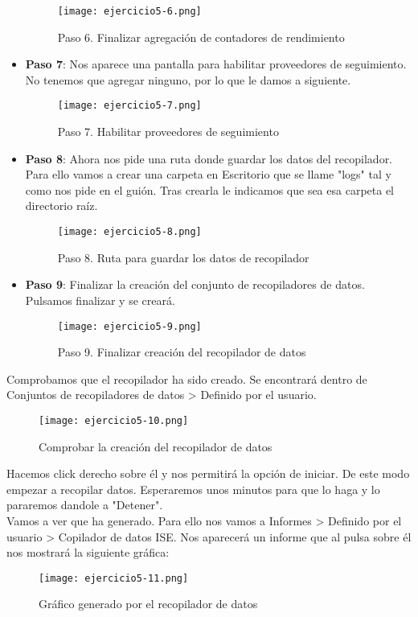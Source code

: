 \begin{itemize}
			\begin{figure}[H] 
				\centering
				\texttt{[image: ejercicio5-6.png]} 
				\label{figura2} 
				\caption{Paso 6. Finalizar agregación de contadores de rendimiento}
			\end{figure}
		\item \textbf{Paso 7}: Nos aparece una pantalla para habilitar proveedores de seguimiento. No tenemos que agregar ninguno, por lo que le damos a siguiente.
			\begin{figure}[H] 
				\centering
				\texttt{[image: ejercicio5-7.png]} 
				\label{figura2} 
				\caption{Paso 7. Habilitar proveedores de seguimiento}
			\end{figure}
		\item \textbf{Paso 8}: Ahora nos pide una ruta donde guardar los datos del recopilador. Para ello vamos a crear una carpeta en Escritorio que se llame "logs" tal y como nos pide en el guión. Tras crearla le indicamos que sea esa carpeta el directorio raíz.
			\begin{figure}[H] 
				\centering
				\texttt{[image: ejercicio5-8.png]} 
				\label{figura2} 
				\caption{Paso 8. Ruta para guardar los datos de recopilador}
			\end{figure}
		\item \textbf{Paso 9}: Finalizar la creación del conjunto de recopiladores de datos. Pulsamos finalizar y se creará.
			\begin{figure}[H] 
				\centering
				\texttt{[image: ejercicio5-9.png]} 
				\label{figura2} 
				\caption{Paso 9. Finalizar creación del recopilador de datos}
			\end{figure}
	\end{itemize}
	
	
	Comprobamos que el recopilador ha sido creado. Se encontrará dentro de Conjuntos de recopiladores de datos > Definido por el usuario.
	\begin{figure}[H] 
		\centering
		\texttt{[image: ejercicio5-10.png]} 
		\label{figura2} 
		\caption{Comprobar la creación del recopilador de datos}
	\end{figure}
	
	Hacemos click derecho sobre él y nos permitirá la opción de iniciar. De este modo empezar a recopilar datos. Esperaremos unos minutos para que lo haga y lo pararemos dandole a "Detener".\\
	
	Vamos a ver que ha generado. Para ello nos vamos a Informes > Definido por el usuario > Copilador de datos ISE. Nos aparecerá un informe que al pulsa sobre él nos mostrará la siguiente gráfica:
	\begin{figure}[H] 
		\centering
		\texttt{[image: ejercicio5-11.png]} 
		\label{figura2} 
		\caption{Gráfico generado por el recopilador de datos}
	\end{figure}
	
